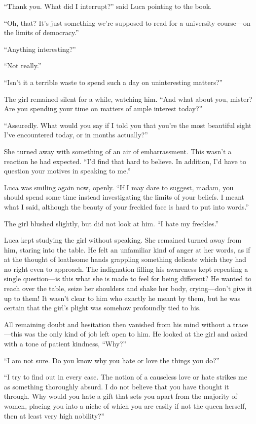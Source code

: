``Thank you. What did I interrupt?'' said Luca pointing to the book.

``Oh, that? It's just something we're supposed to read for a university course---on the limits of democracy.''

``Anything interesting?''

``Not really.''

``Isn't it a terrible waste to spend such a day on uninteresting matters?''

The girl remained silent for a while, watching him. ``And what about you, mister? Are you spending your time on matters of ample interest today?''

``Assuredly. What would you say if I told you that you're the most beautiful sight I've encountered today, or in months actually?''

She turned away with something of an air of embarrassment. This wasn't a reaction he had expected. ``I'd find that hard to believe. In addition, I'd have to question your motives in speaking to me.''

Luca was smiling again now, openly. ``If I may dare to suggest, madam, you should spend some time instead investigating the limits of your beliefs. I meant what I said, although the beauty of your freckled face is hard to put into words.''

The girl blushed slightly, but did not look at him. ``I hate my freckles.''

Luca kept studying the girl without speaking. She remained turned away from him, staring into the table. He felt an unfamiliar kind of anger at her words, as if at the thought of loathsome hands grappling something delicate which they had no right even to approach. The indignation filling his awareness kept repeating a single question---is this what she is made to feel for being different? He wanted to reach over the table, seize her shoulders and shake her body, crying---don't give it up to them! It wasn't clear to him who exactly he meant by them, but he was certain that the girl's plight was somehow profoundly tied to his.

All remaining doubt and hesitation then vanished from his mind without a trace---this was the only kind of job left open to him. He looked at the girl and asked with a tone of patient kindness, ``Why?''

``I am not sure. Do you know why you hate or love the things you do?''

``I try to find out in every case. The notion of a causeless love or hate strikes me as something thoroughly absurd. I do not believe that you have thought it through. Why would you hate a gift that sets you apart from the majority of women, placing you into a niche of which you are easily if not the queen herself, then at least very high nobility?''

